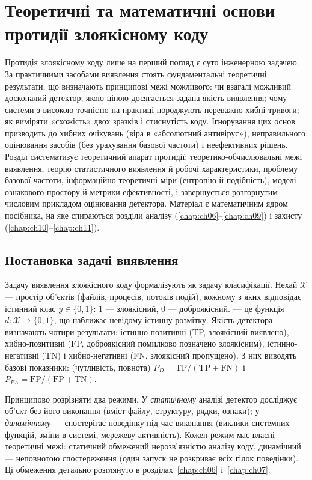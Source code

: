 \chapter{Теоретичні та математичні основи протидії злоякісному коду}
\label{chap:ch03}

Протидія злоякісному коду лише на перший погляд є суто інженерною задачею. За практичними засобами виявлення стоять фундаментальні теоретичні результати, що визначають принципові межі можливого: чи взагалі можливий досконалий детектор; якою ціною досягається задана якість виявлення; чому системи з високою точністю на практиці породжують переважно хибні тривоги; як виміряти «схожість» двох зразків і стиснутість коду. Ігнорування цих основ призводить до хибних очікувань (віра в «абсолютний антивірус»), неправильного оцінювання засобів (без урахування базової частоти) і неефективних рішень. Розділ систематизує теоретичний апарат протидії: теоретико-обчислювальні межі виявлення, теорію статистичного виявлення й робочі характеристики, проблему базової частоти, інформаційно-теоретичні міри (ентропію й подібність), моделі ознакового простору й метрики ефективності, і завершується розгорнутим числовим прикладом оцінювання детектора. Матеріал є математичним ядром посібника, на яке спираються розділи аналізу (\ref{chap:ch06}--\ref{chap:ch09}) і захисту (\ref{chap:ch10}--\ref{chap:ch11}).

\section{Постановка задачі виявлення}\label{sec:ch03-problem}

Задачу виявлення злоякісного коду формалізують як задачу класифікації. Нехай $\mathcal{X}$ --- простір об'єктів (файлів, процесів, потоків подій), кожному з яких відповідає істинний клас $y\in\{0,1\}$: $1$ --- злоякісний, $0$ --- доброякісний.  --- це функція $d:\mathcal{X}\to\{0,1\}$, що наближає невідому істинну розмітку. Якість детектора визначають чотири результати: істинно-позитивні (TP, злоякісний виявлено), хибно-позитивні (FP, доброякісний помилково позначено злоякісним), істинно-негативні (TN) і хибно-негативні (FN, злоякісний пропущено). З них виводять базові показники:  (чутливість, повнота) $P_D = \mathrm{TP}/(\mathrm{TP}+\mathrm{FN})$ і  $P_{FA} = \mathrm{FP}/(\mathrm{FP}+\mathrm{TN})$.

Принципово розрізняти два режими. У \emph{статичному} аналізі детектор досліджує об'єкт без його виконання (вміст файлу, структуру, рядки, ознаки); у \emph{динамічному} --- спостерігає поведінку під час виконання (виклики системних функцій, зміни в системі, мережеву активність). Кожен режим має власні теоретичні межі: статичний обмежений нерозв'язністю аналізу коду, динамічний --- неповнотою спостереження (один запуск не розкриває всіх гілок поведінки). Ці обмеження детально розглянуто в розділах~\ref{chap:ch06} і~\ref{chap:ch07}.

